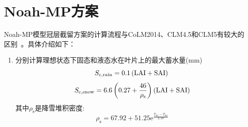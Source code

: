 \section{Noah-MP方案}
Noah-MP模型冠层截留方案的计算流程与CoLM2014、CLM4.5和CLM5有较大的区别~\citep{niu2011community,he2023modernizing}。具体介绍如下：
\begin{enumerate}
  \item 分别计算理想状态下固态和液态水在叶片上的最大蓄水量(mm)\\
    \begin{equation}
      S_{\mathrm{c,rain}}=0.1\left({\rm LAI}+{\rm SAI}\right)\\
    \end{equation}
    \begin{equation}
      S_{\mathrm{c,snow}}= 6.6\left(0.27+{\frac{46}{\rho_{\mathrm{s}}}}\right) \left({\rm LAI}+{\rm SAI}\right)
    \end{equation}
    其中$\rho_{\mathrm{s}}$是降雪堆积密度:
    \begin{equation}
      \rho_{\mathrm{s}}=67.92+51.25 {\mathrm e}^{\frac{T_{\mathrm{sfc}}-T_{\mathrm{frz}}}{2.59}}
    \end{equation}


\end{enumerate}
